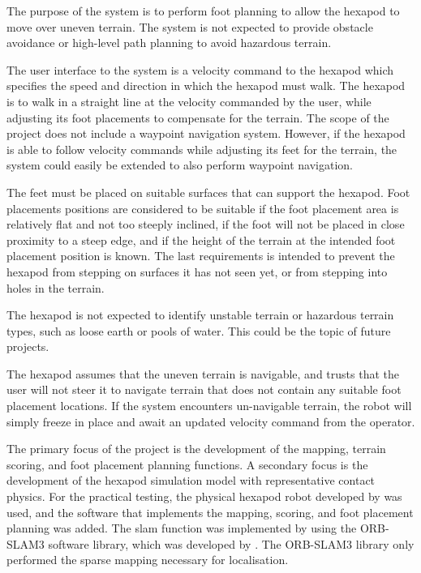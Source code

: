     The purpose of the system is to perform foot planning to allow the hexapod to move over uneven terrain.
    The system is not expected to provide obstacle avoidance or high-level path planning to avoid hazardous terrain.

    The user interface to the system is a velocity command to the hexapod which specifies the speed and direction
    in which the hexapod must walk. The hexapod is to walk in a straight line at the velocity commanded by the
    user, while adjusting its foot placements to compensate for the terrain. The scope of the project does not
    include a waypoint navigation system. However, if the hexapod is able to follow velocity commands while
    adjusting its feet for the terrain, the system could easily be extended to also perform waypoint navigation.

    The feet must be placed on suitable surfaces that can support the hexapod. Foot placements positions are
    considered to be suitable if the foot placement area is relatively flat and not too steeply inclined,
    if the foot will not be placed in close proximity to a steep edge, and if the height of the terrain at
    the intended foot placement position is known. The last requirements is intended to prevent the hexapod
    from stepping on surfaces it has not seen yet, or from stepping into holes in the terrain.

    The hexapod is not expected to identify unstable terrain or hazardous terrain types, such as loose
    earth or pools of water. This could be the topic of future projects.

    The hexapod assumes that the uneven terrain is navigable, and trusts that the user will not steer
    it to navigate terrain that does not contain any suitable foot placement locations. If the system encounters
    un-navigable terrain, the robot will simply freeze in place and await an updated velocity command from the
    operator.

    The primary focus of the project is the development of the mapping, terrain scoring, and foot placement planning
    functions. A secondary focus is the development of the hexapod simulation model with representative contact physics.
    For the practical testing, the physical hexapod robot developed by \cite{erasmus2023guidance} was used, and the software
    that implements the  mapping, scoring, and foot placement planning was added. The \ac{slam} function was implemented
    by using the ORB-SLAM3 software library, which was developed by \cite{campos2021orb}. The ORB-SLAM3 library only performed
    the sparse mapping necessary for localisation.

